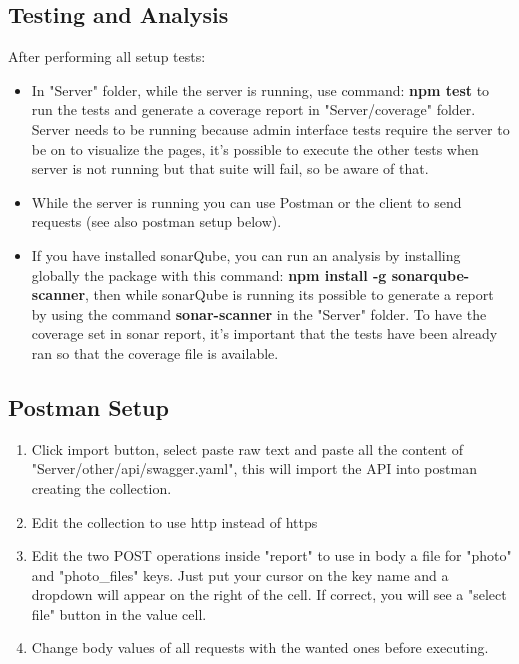 \subsection{Testing and Analysis}
After performing all setup tests:
\begin{itemize}
	\item In "Server" folder, while the server is running, use command: \textbf{npm test} to run the tests and generate a coverage report in "Server/coverage" folder. Server needs to be running because admin interface tests require the server to be on to visualize the pages, it's possible to execute the other tests when server is not running but that suite will fail, so be aware of that.
	\item While the server is running you can use Postman or the client to send requests (see also postman setup below).
	\item If you have installed sonarQube, you can run an analysis by installing globally the package with this command: \textbf{npm install -g sonarqube-scanner}, then while sonarQube is running its possible to generate a report by using the command \textbf{sonar-scanner} in the "Server" folder. To have the coverage set in sonar report, it's important that the tests have been already ran so that the coverage file is available.
\end{itemize}

\subsection{Postman Setup}
\begin{enumerate}
	\item Click import button, select paste raw text and paste all the content of "Server/other/api/swagger.yaml", this will import the API into postman creating the collection.
	\item Edit the collection to use http instead of https
	\item Edit the two POST operations inside "report" to use in body a file for "photo" and "photo\_files" keys. Just put your cursor on the key name and a dropdown will appear on the right of the cell. If correct, you will see a "select file" button in the value cell.
	\item Change body values of all requests with the wanted ones before executing.
\end{enumerate}